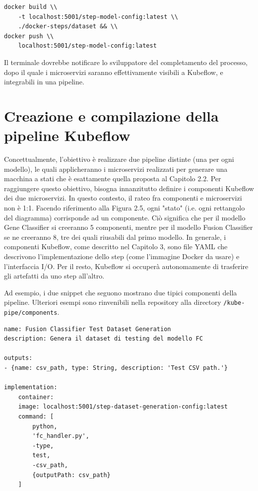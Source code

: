 \begin{small}
\begin{Verbatim}[commandchars=\\\{\}]
docker build \\
    -t localhost:5001/step-model-config:latest \\
    ./docker-steps/dataset && \\
docker push \\
    localhost:5001/step-model-config:latest
\end{Verbatim}
\end{small}

Il terminale dovrebbe notificare lo sviluppatore del completamento del processo, dopo il quale i microservizi saranno effettivamente visibili a Kubeflow, e integrabili in una pipeline.

\section{Creazione e compilazione della pipeline Kubeflow}

Concettualmente, l'obiettivo è realizzare due pipeline distinte (una per ogni modello), le quali applicheranno i microservizi realizzati per generare una macchina a stati che è esattamente quella proposta al Capitolo 2.2. Per raggiungere questo obiettivo, bisogna innanzitutto definire i componenti Kubeflow dei due microservizi. In questo contesto, il rateo fra componenti e microservizi non è 1:1. Facendo riferimento alla Figura 2.5, ogni "stato" (i.e. ogni rettangolo del diagramma) corrisponde ad un componente. Ciò significa che per il modello Gene Classifier si creeranno 5 componenti, mentre per il modello Fusion Classifier se ne creeranno 8, tre dei quali riusabili dal primo modello. In generale, i componenti Kubeflow, come descritto nel Capitolo 3, sono file YAML che descrivono l'implementazione dello step (come l'immagine Docker da usare) e l'interfaccia I/O. Per il resto, Kubeflow si occuperà autonomamente di trasferire gli artefatti da uno step all'altro.

Ad esempio, i due snippet che seguono mostrano due tipici componenti della pipeline. Ulteriori esempi sono rinvenibili nella repository alla directory {\small \verb|/kube-pipe/components|}.

\begin{code}
\label{code:apx:a:yaml}
\begin{verbatim}
name: Fusion Classifier Test Dataset Generation
description: Genera il dataset di testing del modello FC

outputs:
- {name: csv_path, type: String, description: 'Test CSV path.'}

implementation:
    container:
    image: localhost:5001/step-dataset-generation-config:latest
    command: [
        python,
        'fc_handler.py',
        -type,
        test,
        -csv_path, 
        {outputPath: csv_path}
    ]
\end{verbatim}
\end{code}


